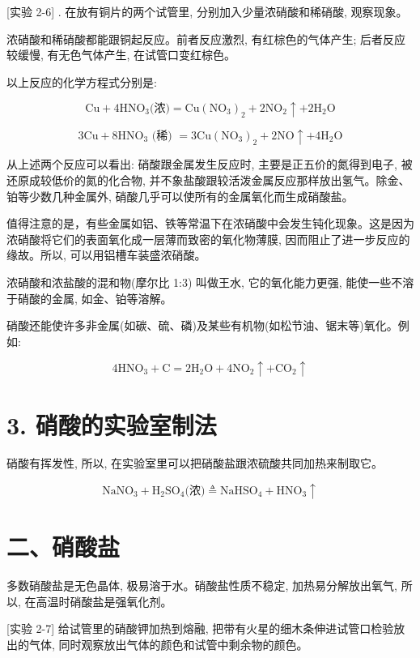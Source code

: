 \documentclass[10pt]{article}
\begin{document}
[实验 2-6] . 在放有铜片的两个试管里, 分别加入少量浓硝酸和稀硝酸, 观察现象。

浓硝酸和稀硝酸都能跟铜起反应。前者反应激烈, 有红棕色的气体产生; 后者反应较缓慢, 有无色气体产生, 在试管口变红棕色。

以上反应的化学方程式分别是:

\[
\mathrm{{Cu}} + 4{\mathrm{{HNO}}}_{3}\text{(浓)} = \mathrm{{Cu}}{\left( {\mathrm{{NO}}}_{3}\right) }_{2} + 2{\mathrm{{NO}}}_{2} \uparrow + 2{\mathrm{H}}_{2}\mathrm{O}
\]

\[
3\mathrm{{Cu}} + 8{\mathrm{{HNO}}}_{3}\text{ (稀) } = 3\mathrm{{Cu}}{\left( {\mathrm{{NO}}}_{3}\right) }_{2} + 2\mathrm{{NO}} \uparrow + 4{\mathrm{H}}_{2}\mathrm{O}
\]

从上述两个反应可以看出: 硝酸跟金属发生反应时, 主要是正五价的氮得到电子, 被还原成较低价的氮的化合物, 并不象盐酸跟较活泼金属反应那样放出氢气。除金、铂等少数几种金属外, 硝酸几乎可以使所有的金属氧化而生成硝酸盐。

值得注意的是，有些金属如铝、铁等常温下在浓硝酸中会发生钝化现象。这是因为浓硝酸将它们的表面氧化成一层薄而致密的氧化物薄膜, 因而阻止了进一步反应的缘故。所以, 可以用铝槽车装盛浓硝酸。

浓硝酸和浓盐酸的混和物(摩尔比 1:3) 叫做王水, 它的氧化能力更强, 能使一些不溶于硝酸的金属, 如金、铂等溶解。

硝酸还能使许多非金属(如碳、硫、磷)及某些有机物(如松节油、锯末等)氧化。例如:

\[
4{\mathrm{{HNO}}}_{3} + \mathrm{C} = 2{\mathrm{H}}_{2}\mathrm{O} + 4{\mathrm{{NO}}}_{2} \uparrow + {\mathrm{{CO}}}_{2} \uparrow
\]

\section*{3. 硝酸的实验室制法}

硝酸有挥发性, 所以, 在实验室里可以把硝酸盐跟浓硫酸共同加热来制取它。

\[
{\mathrm{{NaNO}}}_{3} + {\mathrm{H}}_{2}{\mathrm{{SO}}}_{4}\text{(浓)} \triangleq {\mathrm{{NaHSO}}}_{4} + {\mathrm{{HNO}}}_{3} \uparrow
\]

\section*{二、硝酸盐}

多数硝酸盐是无色晶体, 极易溶于水。硝酸盐性质不稳定, 加热易分解放出氧气, 所以, 在高温时硝酸盐是强氧化剂。

[实验 2-7] 给试管里的硝酸钾加热到熔融, 把带有火星的细木条伸进试管口检验放出的气体, 同时观察放出气体的颜色和试管中剩余物的颜色。
\end{document}
